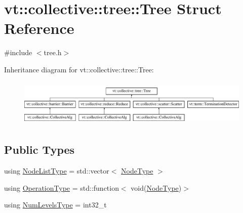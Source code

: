 \hypertarget{structvt_1_1collective_1_1tree_1_1_tree}{}\section{vt\+:\+:collective\+:\+:tree\+:\+:Tree Struct Reference}
\label{structvt_1_1collective_1_1tree_1_1_tree}


{\ttfamily \#include $<$tree.\+h$>$}

Inheritance diagram for vt\+:\+:collective\+:\+:tree\+:\+:Tree\+:\begin{figure}[H]
\begin{center}
\leavevmode
\includegraphics[height=2.270270cm]{structvt_1_1collective_1_1tree_1_1_tree}
\end{center}
\end{figure}
\subsection*{Public Types}
\begin{DoxyCompactItemize}
\item 
using \hyperlink{structvt_1_1collective_1_1tree_1_1_tree_a834e7b54ea2dceae42db7c5ea859753f}{Node\+List\+Type} = std\+::vector$<$ \hyperlink{namespacevt_a866da9d0efc19c0a1ce79e9e492f47e2}{Node\+Type} $>$
\item 
using \hyperlink{structvt_1_1collective_1_1tree_1_1_tree_a5ce4242e9580c807baa74168401f381a}{Operation\+Type} = std\+::function$<$ void(\hyperlink{namespacevt_a866da9d0efc19c0a1ce79e9e492f47e2}{Node\+Type})$>$
\item 
using \hyperlink{structvt_1_1collective_1_1tree_1_1_tree_af64acc9543dc1bd1b56d6ed17b003425}{Num\+Levels\+Type} = int32\+\_\+t
\end{DoxyCompactItemize}
